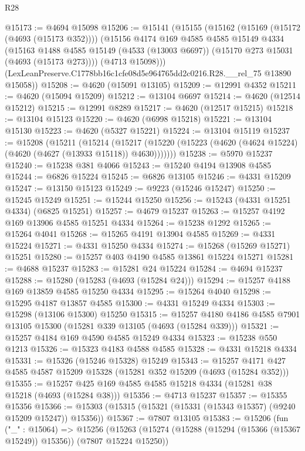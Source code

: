 \begin{lexlean}{R28}
\begin{coremodule}
@15173 := @4694 @15098
@15206 := @15141
    (@15155
      (@15162
        (@15169 (@15172 (@4693 (@15173 @352))))
        (@15156
          @4174
          @169
          @4585
          @4585
          @15149
          @4334
          (@15163
            @1488
            @4585
            @15149
            (@4533 (@13003 @6697))
            (@15170 @273 @15031 (@4693 (@15173 @273))))
          (@4713 @15098)))
      (LexLeanPreserve.C1778bb16c1cfe08d5e964765dd2c0216.R28.__rel_75 @13890 @15058))
@15208 := @4620 (@15091 @13105)
@15209 := @12991 @4352
@15211 := @4620 (@15094 @15209)
@15212 := @13104 @6697
@15214 := @4620 (@12514 @15212)
@15215 := @12991 @8289
@15217 := @4620 (@12517 @15215)
@15218 := @13104 @15123
@15220 := @4620 (@6998 @15218)
@15221 := @13104 @15130
@15223 := @4620 (@5327 @15221)
@15224 := @13104 @15119
@15237 := @15208
    (@15211
      (@15214
        (@15217 (@15220 (@15223 (@4620 (@4624 @15224) (@4620 (@4627 (@13933 @15118)) @4630)))))))
@15238 := @5970 @15237
@15240 := @15238 @381 @4066
@15243 := @15240 @4194 @13908 @4585
@15244 := @6826 @15224
@15245 := @6826 @13105
@15246 := @4331 @15209
@15247 := @13150 @15123
@15249 := @9223 (@15246 @15247)
@15250 := @15245 @15249
@15251 := @15244 @15250
@15256 := @15243 (@4331 @15251 @4334) (@6825 @15251)
@15257 := @4679 @15237
@15263 := @15257 @4192 @169 @13906 @4585 @15251 @4334
@15264 := @15238 @1292
@15265 := @15264 @4041
@15268 := @15265 @4191 @13904 @4585
@15269 := @4331 @15224
@15271 := @4331 @15250 @4334
@15274 := @15268 (@15269 @15271) @15251
@15280 := @15257 @403 @4190 @4585 @13861 @15224 @15271
@15281 := @4688 @15237
@15283 := @15281 @24 @15224
@15284 := @4694 @15237
@15288 := @15280 (@15283 (@4693 (@15284 @24)))
@15294 := @15257 @4188 @169 @13859 @4585 @15250 @4334
@15295 := @15264 @4040
@15298 := @15295 @4187 @13857 @4585
@15300 := @4331 @15249 @4334
@15303 := @15298 (@13106 @15300) @15250
@15315 := @15257 @4180 @4186 @4585 @7901 @13105 @15300 (@15281 @339 @13105 (@4693 (@15284 @339)))
@15321 := @15257 @4184 @169 @4590 @4585 @15249 @4334
@15323 := @15238 @550 @1213
@15326 := @15323 @4183 @4588 @4585
@15328 := @4331 @15218 @4334
@15331 := @15326 (@15246 @15328) @15249
@15343 := @15257 @4171 @427 @4585 @4587 @15209 @15328 (@15281 @352 @15209 (@4693 (@15284 @352)))
@15355 := @15257 @425 @169 @4585 @4585 @15218 @4334 (@15281 @38 @15218 (@4693 (@15284 @38)))
@15356 := @4713 @15237
@15357 := @15355 @15356
@15366 := @15303 (@15315 (@15321 (@15331 (@15343 @15357) (@9240 @15209 @15247)) @15356))
@15367 := @7807 @13105
@15383 := @15206
    (fun ("_" : @15064) =>
    @15256
      (@15263
        (@15274 (@15288 (@15294 (@15366 (@15367 @15249)) @15356)) (@7807 @15224 @15250))

\end{coremodule}
\end{lexlean}
